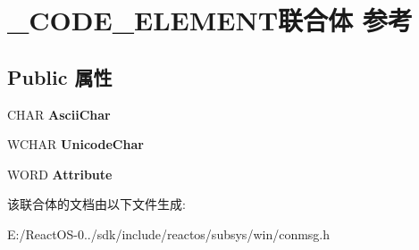\hypertarget{union___c_o_d_e___e_l_e_m_e_n_t}{}\section{\+\_\+\+C\+O\+D\+E\+\_\+\+E\+L\+E\+M\+E\+N\+T联合体 参考}
\label{union___c_o_d_e___e_l_e_m_e_n_t}
\subsection*{Public 属性}
\begin{DoxyCompactItemize}
\item 
\mbox{\label{union___c_o_d_e___e_l_e_m_e_n_t_ac104e8eff875bb068e7e816a866c2eaa}} 
C\+H\+AR {\bfseries Ascii\+Char}
\item 
\mbox{\label{union___c_o_d_e___e_l_e_m_e_n_t_aa7da6fc736c03f3c2d03bb163cc7b12d}} 
W\+C\+H\+AR {\bfseries Unicode\+Char}
\item 
\mbox{\label{union___c_o_d_e___e_l_e_m_e_n_t_a040069846c9ba67d58ea3ebfd8351064}} 
W\+O\+RD {\bfseries Attribute}
\end{DoxyCompactItemize}


该联合体的文档由以下文件生成\+:\begin{DoxyCompactItemize}
\item 
E\+:/\+React\+O\+S-\/0../sdk/include/reactos/subsys/win/conmsg.\+h\end{DoxyCompactItemize}
